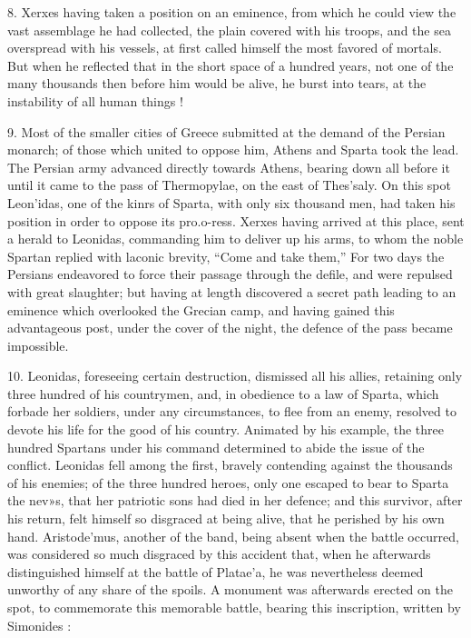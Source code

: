 \documentclass[openany,a4paper]{memoir}
\begin{document}
8. Xerxes having taken a position on an eminence, from 
which he could view the vast assemblage he had collected, 
the plain covered with his troops, and the sea overspread 
with his vessels, at first called himself the most favored of 
mortals. But when he reflected that in the short space of a 
hundred years, not one of the many thousands then before 
him would be alive, he burst into tears, at the instability of 
all human things ! 

9. Most of the smaller cities of Greece submitted at the demand of the Persian monarch; of those which united to oppose him, Athens and Sparta took the lead. The Persian 
army advanced directly towards Athens, bearing down all 
before it until it came to the pass of Thermopylae, on the east 
of Thes'saly. On this spot Leon'idas, one of the kinrs of 
Sparta, with only six thousand men, had taken his position 
in order to oppose its pro.o-ress. Xerxes having arrived at 
this place, sent a herald to Leonidas, commanding him to deliver up his arms, to whom the noble Spartan replied with 
laconic brevity, ``Come and take them,'' For two days the 
Persians endeavored to force their passage through the defile, 
and were repulsed with great slaughter; but having at length 
discovered a secret path leading to an eminence which overlooked the Grecian camp, and having gained this advantageous post, under the cover of the night, the defence of 
the pass became impossible. 

10. Leonidas, foreseeing certain destruction, dismissed all 
his allies, retaining only three hundred of his countrymen, 
and, in obedience to a law of Sparta, which forbade her soldiers, 
under any circumstances, to flee from an enemy, resolved to 
devote his life for the good of his country. Animated by his 
example, the three hundred Spartans under his command 
determined to abide the issue of the conflict. Leonidas fell 
among the first, bravely contending against the thousands of 
his enemies; of the three hundred heroes, only one escaped to 
bear to Sparta the nev»s, that her patriotic sons had died in 
her defence; and this survivor, after his return, felt himself 
so disgraced at being alive, that he perished by his own hand. 
Aristode'mus, another of the band, being absent when the 
battle occurred, was considered so much disgraced by this 
accident that, when he afterwards distinguished himself at 
the battle of Platae'a, he was nevertheless deemed unworthy 
of any share of the spoils. A monument was afterwards 
erected on the spot, to commemorate this memorable battle, 
bearing this inscription, written by Simonides : 
\end{document}
